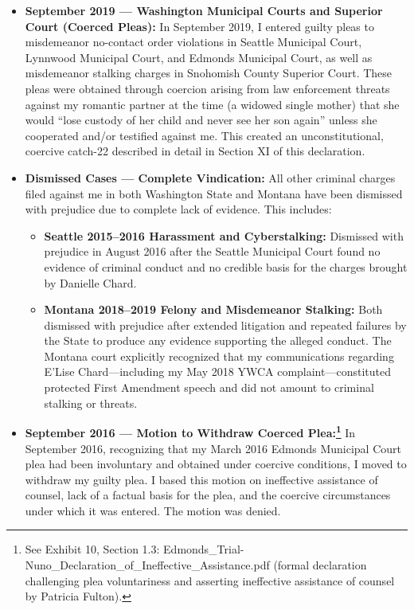 \documentclass[12pt,letterpaper]{article}
\begin{document}
\begin{enumerate}
\begin{itemize}
  \item \textbf{September 2019 --- Washington Municipal Courts and Superior Court (Coerced Pleas):} In September 2019, I entered guilty pleas to misdemeanor no-contact order violations in Seattle Municipal Court, Lynnwood Municipal Court, and Edmonds Municipal Court, as well as misdemeanor stalking charges in Snohomish County Superior Court. These pleas were obtained through coercion arising from law enforcement threats against my romantic partner at the time (a widowed single mother) that she would ``lose custody of her child and never see her son again'' unless she cooperated and/or testified against me. This created an unconstitutional, coercive catch-22 described in detail in Section XI of this declaration.

  \item \textbf{Dismissed Cases --- Complete Vindication:} All other criminal charges filed against me in both Washington State and Montana have been dismissed with prejudice due to complete lack of evidence. This includes:

  \begin{itemize}
  \item \textbf{Seattle 2015--2016 Harassment and Cyberstalking:} Dismissed with prejudice in August 2016 after the Seattle Municipal Court found no evidence of criminal conduct and no credible basis for the charges brought by Danielle Chard.

  \item \textbf{Montana 2018--2019 Felony and Misdemeanor Stalking:} Both dismissed with prejudice after extended litigation and repeated failures by the State to produce any evidence supporting the alleged conduct. The Montana court explicitly recognized that my communications regarding E'Lise Chard---including my May 2018 YWCA complaint---constituted protected First Amendment speech and did not amount to criminal stalking or threats.
  \end{itemize}

\item \textbf{September 2016 --- Motion to Withdraw Coerced Plea:\footnote{See Exhibit 10, Section 1.3: Edmonds\_Trial-Nuno\_Declaration\_of\_Ineffective\_Assistance.pdf (formal declaration challenging plea voluntariness and asserting ineffective assistance of counsel by Patricia Fulton).}} In September 2016, recognizing that my March 2016 Edmonds Municipal Court plea had been involuntary and obtained under coercive conditions, I moved to withdraw my guilty plea. I based this motion on ineffective assistance of counsel, lack of a factual basis for the plea, and the coercive circumstances under which it was entered. The motion was denied.


\end{itemize}
\end{enumerate}
\end{document}
